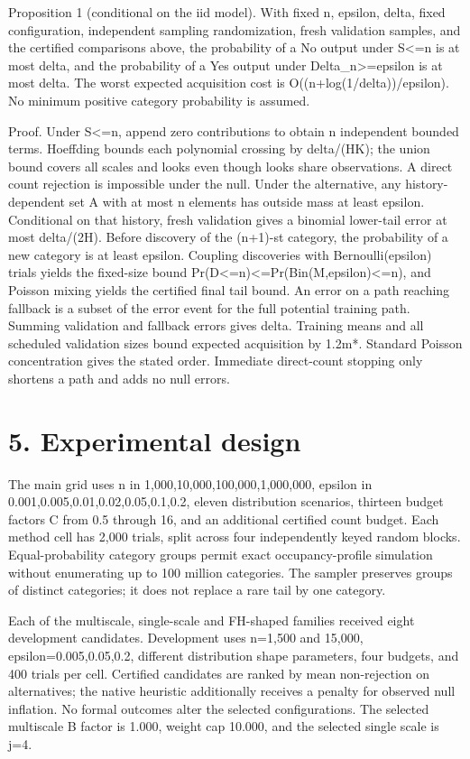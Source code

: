 \documentclass[10pt]{article}
\begin{document}
Proposition 1 (conditional on the iid model). With fixed n, epsilon, delta, fixed configuration, independent sampling randomization, fresh validation samples, and the certified comparisons above, the probability of a No output under S<=n is at most delta, and the probability of a Yes output under Delta\_n>=epsilon is at most delta. The worst expected acquisition cost is O((n+log(1/delta))/epsilon). No minimum positive category probability is assumed.

Proof. Under S<=n, append zero contributions to obtain n independent bounded terms. Hoeffding bounds each polynomial crossing by delta/(HK); the union bound covers all scales and looks even though looks share observations. A direct count rejection is impossible under the null. Under the alternative, any history-dependent set A with at most n elements has outside mass at least epsilon. Conditional on that history, fresh validation gives a binomial lower-tail error at most delta/(2H). Before discovery of the (n+1)-st category, the probability of a new category is at least epsilon. Coupling discoveries with Bernoulli(epsilon) trials yields the fixed-size bound Pr(D<=n)<=Pr(Bin(M,epsilon)<=n), and Poisson mixing yields the certified final tail bound. An error on a path reaching fallback is a subset of the error event for the full potential training path. Summing validation and fallback errors gives delta. Training means and all scheduled validation sizes bound expected acquisition by 1.2m*. Standard Poisson concentration gives the stated order. Immediate direct-count stopping only shortens a path and adds no null errors.

\section*{5. Experimental design}
The main grid uses n in {1,000,10,000,100,000,1,000,000}, epsilon in {0.001,0.005,0.01,0.02,0.05,0.1,0.2}, eleven distribution scenarios, thirteen budget factors C from 0.5 through 16, and an additional certified count budget. Each method cell has 2,000 trials, split across four independently keyed random blocks. Equal-probability category groups permit exact occupancy-profile simulation without enumerating up to 100 million categories. The sampler preserves groups of distinct categories; it does not replace a rare tail by one category.

Each of the multiscale, single-scale and FH-shaped families received eight development candidates. Development uses n=1,500 and 15,000, epsilon=0.005,0.05,0.2, different distribution shape parameters, four budgets, and 400 trials per cell. Certified candidates are ranked by mean non-rejection on alternatives; the native heuristic additionally receives a penalty for observed null inflation. No formal outcomes alter the selected configurations. The selected multiscale B factor is 1.000, weight cap 10.000, and the selected single scale is j=4.
\end{document}
